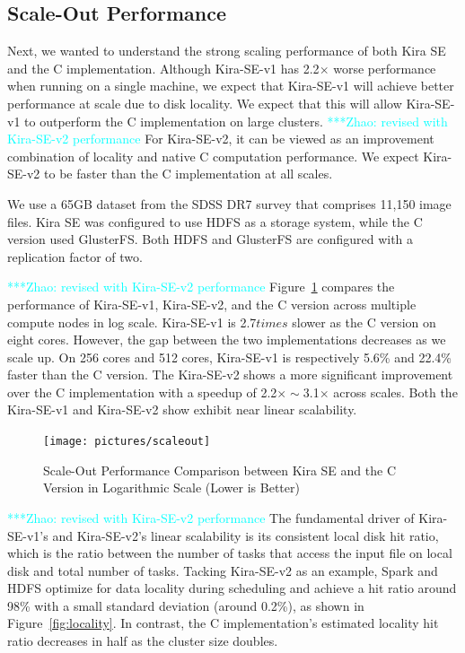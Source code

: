 \documentclass[10pt,journal,compsoc]{IEEEtran}
\newcommand{\zhaonote}[1]{{\textcolor{cyan}    { ***Zhao:      #1 }}}
\newcommand{\zhaonote}[1]{}
\begin{document}
\subsection{Scale-Out Performance}
\label{sec:Performance-scaleout}

Next, we wanted to understand the strong scaling performance of both Kira SE and the C
implementation. Although Kira-SE-v1 has 2.2$\times$ worse performance when running on
a single machine, we expect that Kira-SE-v1 will achieve better performance at scale due
to disk locality. We expect that this will allow Kira-SE-v1 to outperform the C implementation
on large clusters. 
\zhaonote{revised with Kira-SE-v2 performance}
For Kira-SE-v2, it can be viewed as an improvement combination of locality and native C
computation performance. We expect Kira-SE-v2 to be faster than the C implementation
at all scales.

We use a 65GB dataset from the SDSS DR7 survey that comprises 11,150 image files.
Kira SE was configured to use HDFS as a storage system, while the C version used GlusterFS. 
Both HDFS and GlusterFS are configured with a replication factor of two.

\zhaonote{revised with Kira-SE-v2 performance}
Figure~\ref{fig:scaleout} compares the performance of Kira-SE-v1, Kira-SE-v2, and the C version across
multiple compute nodes in log scale. 
Kira-SE-v1 is 2.7$times$ slower as the C version on eight cores. 
However, the gap between the two implementations decreases as we scale up. 
On 256 cores and 512 cores, Kira-SE-v1 is respectively 5.6\% and 22.4\% faster than the C version.
The Kira-SE-v2 shows a more significant improvement over the C implementation with a speedup of
2.2$\times\sim$3.1$\times$ across scales.
Both the Kira-SE-v1 and Kira-SE-v2 show exhibit near linear scalability.


\begin{figure}[h]
	\begin{center}
		\texttt{[image: pictures/scaleout]}
		\caption{Scale-Out Performance Comparison between Kira SE and the C Version in Logarithmic Scale (Lower is Better)
		\label{fig:scaleout}}
  	\end{center}
\end{figure}

\zhaonote{revised with Kira-SE-v2 performance}
The fundamental driver of Kira-SE-v1's and Kira-SE-v2's linear scalability is its consistent local disk
hit ratio, which is the ratio between the number of tasks that access the input file 
on local disk and total number of tasks. Tacking Kira-SE-v2 as an example, Spark and HDFS optimize for data locality during scheduling and achieve a
hit ratio around 98\% with a small standard deviation (around 0.2\%), as shown in Figure~\ref{fig:locality}. 
In contrast, the C implementation's estimated locality hit ratio decreases in half as the cluster size doubles.
\end{document}
